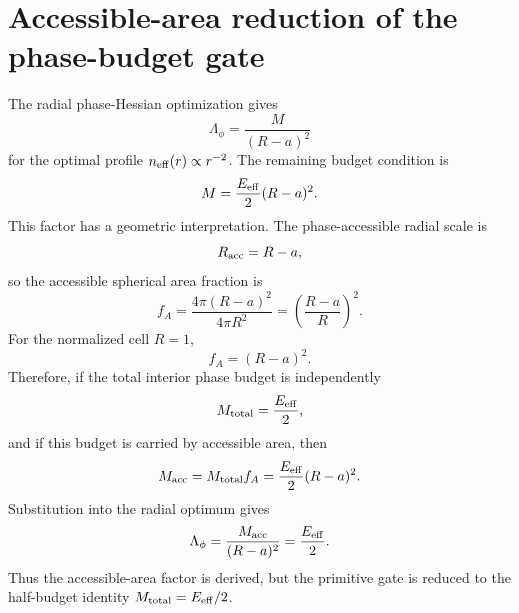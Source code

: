 \section{Accessible-area reduction of the phase-budget gate}
\label{app:accessible-area-phase-budget}

The radial phase-Hessian optimization gives
\[
  \Lambda_\phi=\frac{M}{(R-a)^2}
\]
for the optimal profile \(n_{\rm eff}(r)\propto r^{-2}\).  The remaining
budget condition is
\[
  M=\frac{E_{\rm eff}}{2}(R-a)^2.
\]
This factor has a geometric interpretation.  The phase-accessible radial scale
is
\[
  R_{\rm acc}=R-a,
\]
so the accessible spherical area fraction is
\[
  f_A
  =
  \frac{4\pi(R-a)^2}{4\pi R^2}
  =
  \left(\frac{R-a}{R}\right)^2.
\]
For the normalized cell \(R=1\),
\[
  f_A=(R-a)^2.
\]
Therefore, if the total interior phase budget is independently
\[
  M_{\rm total}=\frac{E_{\rm eff}}{2},
\]
and if this budget is carried by accessible area, then
\[
  M_{\rm acc}
  =
  M_{\rm total}f_A
  =
  \frac{E_{\rm eff}}{2}(R-a)^2.
\]
Substitution into the radial optimum gives
\[
  \Lambda_\phi
  =
  \frac{M_{\rm acc}}{(R-a)^2}
  =
  \frac{E_{\rm eff}}{2}.
\]
Thus the accessible-area factor is derived, but the primitive gate is reduced
to the half-budget identity \(M_{\rm total}=E_{\rm eff}/2\).
